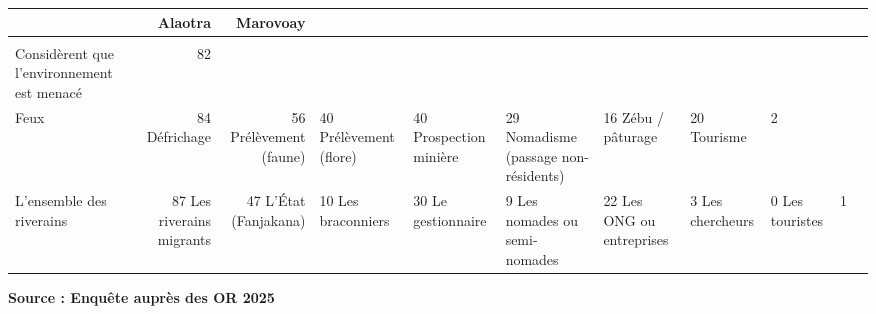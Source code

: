\begin{table}
{\fontsize{12.0pt}{14.0pt}\selectfont
\begin{tabular*}{\linewidth}{@{\extracolsep{\fill}}lrr}
\toprule
 & {\bfseries {Alaotra}} & {\bfseries {Marovoay}} \\ 
\midrule\addlinespace[2.5pt]
 \\[2.5pt] 
\midrule\addlinespace[2.5pt]
Considèrent que l'environnement est menacé & 82 %
\midrule\addlinespace[2.5pt]
 \\[2.5pt] 
\midrule\addlinespace[2.5pt]
Feux & 84 %
Défrichage & 56 %
Prélèvement (faune) & 40 %
Prélèvement (flore) & 40 %
Prospection minière & 29 %
Nomadisme (passage non-résidents) & 16 %
Zébu / pâturage & 20 %
Tourisme & 2 %
\midrule\addlinespace[2.5pt]
 \\[2.5pt] 
\midrule\addlinespace[2.5pt]
L'ensemble des riverains & 87 %
Les riverains migrants & 47 %
L'État (Fanjakana) & 10 %
Les braconniers & 30 %
Le gestionnaire & 9 %
Les nomades ou semi-nomades & 22 %
Les ONG ou entreprises & 3 %
Les chercheurs & 0 %
Les touristes & 1 %
\bottomrule
\end{tabular*}
\begin{minipage}{\linewidth}
\textbf{Source : Enquête auprès des OR 2025}\\
\end{minipage}

}

\end{table}%

